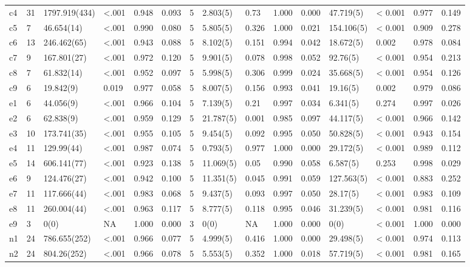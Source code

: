 \documentclass[man]{apa6}
\theoremstyle{definition}
\theoremstyle{definition}
\theoremstyle{definition}
\theoremstyle{remark}
\begin{document}
\begin{table}
{\begin{tabular}[t]{lllllllllllllll}
c4 & 31 & 1797.919(434) & <.001 & 0.948 & 0.093 & 5 & 2.803(5) & 0.73 & 1.000 & 0.000 & 47.719(5) & < 0.001 & 0.977 & 0.149\\
c5 & 7 & 46.654(14) & <.001 & 0.990 & 0.080 & 5 & 5.805(5) & 0.326 & 1.000 & 0.021 & 154.106(5) & < 0.001 & 0.909 & 0.278\\
c6 & 13 & 246.462(65) & <.001 & 0.943 & 0.088 & 5 & 8.102(5) & 0.151 & 0.994 & 0.042 & 18.672(5) & 0.002 & 0.978 & 0.084\\
c7 & 9 & 167.801(27) & <.001 & 0.972 & 0.120 & 5 & 9.901(5) & 0.078 & 0.998 & 0.052 & 92.76(5) & < 0.001 & 0.954 & 0.213\\
c8 & 7 & 61.832(14) & <.001 & 0.952 & 0.097 & 5 & 5.998(5) & 0.306 & 0.999 & 0.024 & 35.668(5) & < 0.001 & 0.954 & 0.126\\
c9 & 6 & 19.842(9) & 0.019 & 0.977 & 0.058 & 5 & 8.007(5) & 0.156 & 0.993 & 0.041 & 19.16(5) & 0.002 & 0.979 & 0.086\\
e1 & 6 & 44.056(9) & <.001 & 0.966 & 0.104 & 5 & 7.139(5) & 0.21 & 0.997 & 0.034 & 6.341(5) & 0.274 & 0.997 & 0.026\\
e2 & 6 & 62.838(9) & <.001 & 0.959 & 0.129 & 5 & 21.787(5) & 0.001 & 0.985 & 0.097 & 44.117(5) & < 0.001 & 0.966 & 0.142\\
e3 & 10 & 173.741(35) & <.001 & 0.955 & 0.105 & 5 & 9.454(5) & 0.092 & 0.995 & 0.050 & 50.828(5) & < 0.001 & 0.943 & 0.154\\
e4 & 11 & 129.99(44) & <.001 & 0.987 & 0.074 & 5 & 0.793(5) & 0.977 & 1.000 & 0.000 & 29.172(5) & < 0.001 & 0.989 & 0.112\\
e5 & 14 & 606.141(77) & <.001 & 0.923 & 0.138 & 5 & 11.069(5) & 0.05 & 0.990 & 0.058 & 6.587(5) & 0.253 & 0.998 & 0.029\\
e6 & 9 & 124.476(27) & <.001 & 0.942 & 0.100 & 5 & 11.351(5) & 0.045 & 0.991 & 0.059 & 127.563(5) & < 0.001 & 0.883 & 0.252\\
e7 & 11 & 117.666(44) & <.001 & 0.983 & 0.068 & 5 & 9.437(5) & 0.093 & 0.997 & 0.050 & 28.17(5) & < 0.001 & 0.983 & 0.109\\
e8 & 11 & 260.004(44) & <.001 & 0.963 & 0.117 & 5 & 8.777(5) & 0.118 & 0.995 & 0.046 & 31.239(5) & < 0.001 & 0.981 & 0.116\\
e9 & 3 & 0(0) & NA & 1.000 & 0.000 & 3 & 0(0) & NA & 1.000 & 0.000 & 0(0) & < 0.001 & 1.000 & 0.000\\
n1 & 24 & 786.655(252) & <.001 & 0.966 & 0.077 & 5 & 4.999(5) & 0.416 & 1.000 & 0.000 & 29.498(5) & < 0.001 & 0.974 & 0.113\\
n2 & 24 & 804.26(252) & <.001 & 0.966 & 0.078 & 5 & 5.553(5) & 0.352 & 1.000 & 0.018 & 57.719(5) & < 0.001 & 0.981 & 0.165\\

\end{tabular}}
\end{table}
\end{document}
